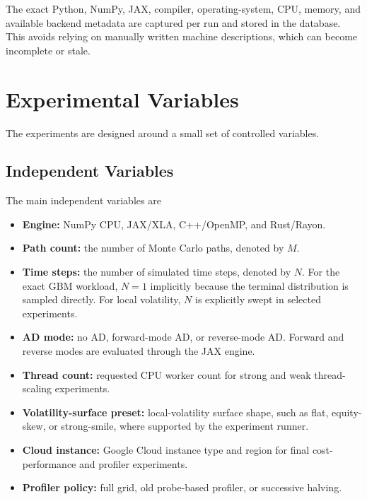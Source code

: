 The exact Python, NumPy, JAX, compiler, operating-system, CPU, memory, and
available backend metadata are captured per run and stored in the database.
This avoids relying on manually written machine descriptions, which can
become incomplete or stale.

\section{Experimental Variables}
\label{sec:exp-variables}

The experiments are designed around a small set of controlled variables.

\subsection{Independent Variables}

The main independent variables are

\begin{itemize}
    \item \textbf{Engine:} NumPy CPU, JAX/XLA, C++/OpenMP, and Rust/Rayon.

    \item \textbf{Path count:} the number of Monte Carlo paths, denoted by
    \(M\).

    \item \textbf{Time steps:} the number of simulated time steps, denoted
    by \(N\).  For the exact GBM workload, \(N=1\) implicitly because the
    terminal distribution is sampled directly.  For local volatility,
    \(N\) is explicitly swept in selected experiments.

    \item \textbf{AD mode:} no AD, forward-mode AD, or reverse-mode AD.
    Forward and reverse modes are evaluated through the JAX engine.

    \item \textbf{Thread count:} requested CPU worker count for strong and
    weak thread-scaling experiments.

    \item \textbf{Volatility-surface preset:} local-volatility surface shape,
    such as flat, equity-skew, or strong-smile, where supported by the
    experiment runner.

    \item \textbf{Cloud instance:} Google Cloud instance type and region for
    final cost-performance and profiler experiments.

    \item \textbf{Profiler policy:} full grid, old probe-based profiler, or
    successive halving.
\end{itemize}

